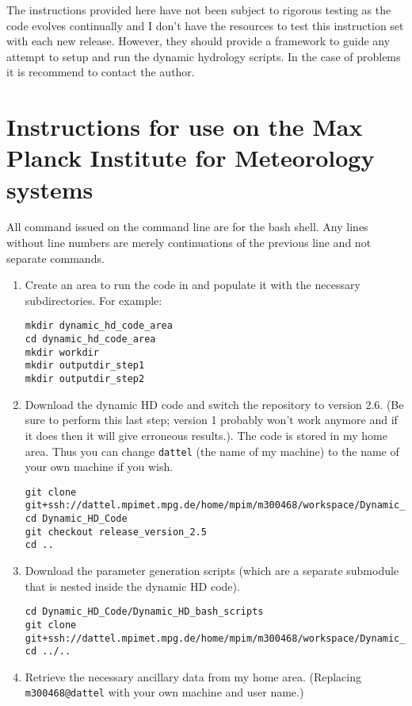 \documentclass{article}
\begin{document}
The instructions provided here have not been subject to rigorous testing as the code evolves continually and I don't have the resources to test this instruction set with each new release. However, they should provide a framework to guide any attempt to setup and run the dynamic hydrology scripts. In the case of problems it is recommend to contact the author.
\section{Instructions for use on the Max Planck Institute for Meteorology systems} \label{section-max-planck-instructions}
All command issued on the command line are for the bash shell. Any lines without line numbers are merely continuations of the previous line and not separate commands.
\begin{enumerate}
\item Create an area to run the code in and populate it with the necessary subdirectories. For example:
\begin{lstlisting}[style=bash_input]
mkdir dynamic_hd_code_area
cd dynamic_hd_code_area
mkdir workdir
mkdir outputdir_step1
mkdir outputdir_step2
\end{lstlisting}
\item Download the dynamic HD code and switch the repository to version 2.6. (Be sure to perform this last step; version 1 probably won't work anymore and if it does then it will give erroneous results.). The code is stored in my home area. Thus you can change  \lstinline[style=bash_input]{dattel} (the name of my machine) to the name of your own machine if you wish.
\begin{lstlisting}[style=bash_input,breaklines=true]
git clone git+ssh://dattel.mpimet.mpg.de/home/mpim/m300468/workspace/Dynamic_HD_Code
cd Dynamic_HD_Code
git checkout release_version_2.5
cd ..
\end{lstlisting}
\item Download the parameter generation scripts (which are a separate submodule that is nested inside the dynamic HD code). 
\begin{lstlisting}[style=bash_input,breaklines=true]
cd Dynamic_HD_Code/Dynamic_HD_bash_scripts
git clone git+ssh://dattel.mpimet.mpg.de/home/mpim/m300468/workspace/Dynamic_HD_Code/Dynamic_HD_bash_scripts/parameter_generation_scripts
cd ../..
\end{lstlisting}
\item Retrieve the necessary ancillary data from my home area. (Replacing \lstinline[style=bash_input]{m300468@dattel} with your own machine and user name.)

\end{enumerate}
\end{document}

